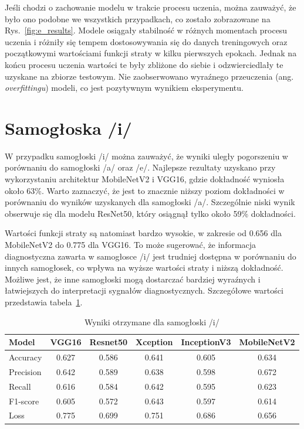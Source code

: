 Jeśli chodzi o zachowanie modelu w trakcie procesu uczenia, można zauważyć, że było ono podobne we wszystkich przypadkach, co zostało zobrazowane na Rys.~\ref{fig:e_results}.
Modele osiągały stabilność w różnych momentach procesu uczenia i różniły się tempem dostosowywania się do danych treningowych oraz początkowymi wartościami funkcji straty w kilku pierwszych epokach.
Jednak na końcu procesu uczenia wartości te były zbliżone do siebie i odzwierciedlały te uzyskane na zbiorze testowym.
Nie zaobserwowano wyraźnego przeuczenia (ang. \emph{overfittingu}) modeli, co jest pozytywnym wynikiem eksperymentu.

\section{Samogłoska /i/}
\label{sec:samogloska-i}

W przypadku samogłoski /i/ można zauważyć, że wyniki uległy pogorszeniu w porównaniu do samogłoski /a/ oraz /e/.
Najlepsze rezultaty uzyskano przy wykorzystaniu architektur MobileNetV2 i VGG16, gdzie dokładność wyniosła około 63\%.
Warto zaznaczyć, że jest to znacznie niższy poziom dokładności w porównaniu do wyników uzyskanych dla samogłoski /a/.
Szczególnie niski wynik obserwuje się dla modelu ResNet50, który osiągnął tylko około 59\% dokładności.

Wartości funkcji straty są natomiast bardzo wysokie, w zakresie od 0.656 dla MobileNetV2 do 0.775 dla VGG16.
To może sugerować, że informacja diagnostyczna zawarta w samogłosce /i/ jest trudniej dostępna w porównaniu do innych samogłosek, co wpływa na wyższe wartości straty i niższą dokładność.
Możliwe jest, że inne samogłoski mogą dostarczać bardziej wyraźnych i łatwiejszych do interpretacji sygnałów diagnostycznych.
Szczegółowe wartości przedstawia tabela~\ref{tab:wyniki-i}.

\begin{table}[ht]
\centering
\caption{Wyniki otrzymane dla samogłoski /i/}
\label{tab:wyniki-i}
\begin{tabular}{|l|c|c|c|c|c|}
\hline
\textbf{Model} &\textbf{VGG16} &\textbf{Resnet50} &\textbf{Xception} &\textbf{InceptionV3} &\textbf{MobileNetV2} \\ \hline
    Accuracy &0.627 &0.586 &0.641 &0.605 &0.634 \\ \hline
    Precision &0.642 &0.589 &0.638 &0.598 &0.672 \\ \hline
    Recall &0.616 &0.584 &0.642 &0.595  &0.623 \\ \hline
    F1-score &0.605 &0.572 &0.643 &0.597 &0.614 \\ \hline
    Loss &0.775 &0.699 &0.751 &0.686 &0.656 \\ \hline
\end{tabular}
\end{table}

